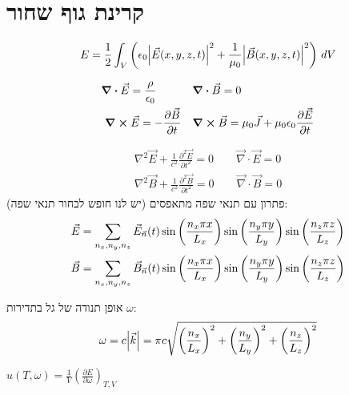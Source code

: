 \section{קרינת גוף שחור}
\begin{cheatformula}
\begin{align*}
    E = \frac{1}{2} \int_V \left( \epsilon_0 \abs{\vec{E}(x, y, z, t)}^2 + \frac{1}{\mu_0} \abs{\vec{B}(x, y, z, t)}^2 \right) \, dV
\end{align*}
\end{cheatformula}
\begin{cheatformula}
    \begin{align*}
    & \div \vec{E} = \frac{\rho}{\epsilon_0} 
    && \div \vec{B} = 0 \\
    &\ \curl \vec{E} = -\frac{\partial \vec{B}}{\partial t}
    && \curl \vec{B} = \mu_0 \vec{J} + \mu_0 \epsilon_0 \frac{\partial \vec{E}}{\partial t}
\end{align*}

\begin{cheatformula}
\begin{align*}
    \nabla^2 \vec{E} + \frac{1}{c^2} \frac{\partial^2 \vec{E}}{\partial t^2} = 0 \qquad \vec{\nabla} \cdot \vec{E} = 0 \\
    \nabla^2 \vec{B} + \frac{1}{c^2} \frac{\partial^2 \vec{B}}{\partial t^2} = 0 \qquad \vec{\nabla} \cdot \vec{B} = 0
\end{align*}
פתרון עם תנאי שפה מתאפסים (יש לנו חופש לבחור תנאי שפה):
\begin{align*}
    \vec{E} &= \sum_{\scriptsize n_x,n_y,n_z} \vec{E}_{\vec{n}}(t) \sin\left(\frac{n_x \pi x}{L_x}\right) \sin\left(\frac{n_y \pi y}{L_y}\right) \sin\left(\frac{n_z \pi z}{L_z}\right) \\
    \vec{B} &= \sum_{\scriptsize n_x,n_y,n_z} \vec{B}_{\vec{n}}(t) \sin\left(\frac{n_x \pi x}{L_x}\right) \sin\left(\frac{n_y \pi y}{L_y}\right) \sin\left(\frac{n_z \pi z}{L_z}\right)
\end{align*}
\end{cheatformula}

אופן תנודה של גל בתדירות $\omega$:
\[
\omega = c \abs{\vec{k}} = \pi c \sqrt{ \left( \frac{n_x}{L_x} \right)^2 + \left( \frac{n_y}{L_y} \right)^2 + \left( \frac{n_z}{L_z} \right)^2 }
\]

\end{cheatformula}

\begin{cheatformula}
$
    u(T,\omega) = \frac{1}{V} \left( \frac{\partial E}{\partial \omega} \right)_{T,V}
$
\end{cheatformula}

